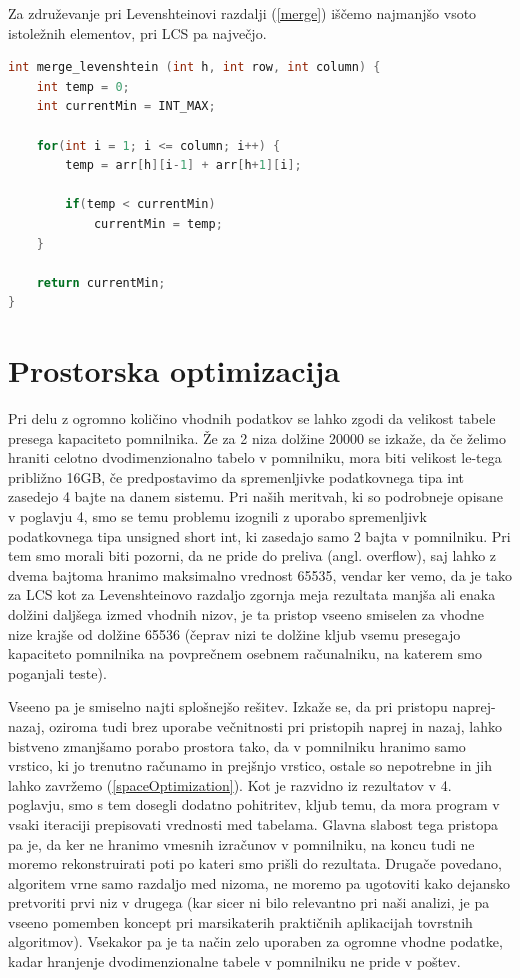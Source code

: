 \documentclass[a4paper,12pt,openright]{book}
\begin{document}
Za združevanje pri Levenshteinovi razdalji (\ref{merge}) iščemo najmanjšo vsoto istoležnih elementov, pri LCS pa največjo. 


\bigskip
\begin{lstlisting}[language=C++, caption={Združevalna funkcija za Levenshteinovo razdaljo}, captionpos=b, label=merge]
int merge_levenshtein (int h, int row, int column) {
    int temp = 0;
    int currentMin = INT_MAX;

    for(int i = 1; i <= column; i++) {
        temp = arr[h][i-1] + arr[h+1][i];

        if(temp < currentMin)
            currentMin = temp;
    }

    return currentMin;
}
\end{lstlisting}




\section{Prostorska optimizacija}

Pri delu z ogromno količino vhodnih podatkov se lahko zgodi da velikost tabele presega kapaciteto pomnilnika. Že za 2 niza dolžine 20000 se izkaže, da če želimo hraniti celotno dvodimenzionalno tabelo v pomnilniku, mora biti velikost le-tega približno 16GB, če predpostavimo da spremenljivke podatkovnega tipa int zasedejo 4 bajte na danem sistemu. Pri naših meritvah, ki so podrobneje opisane v poglavju 4, smo se temu problemu izognili z uporabo spremenljivk podatkovnega tipa unsigned short int, ki zasedajo samo 2 bajta v pomnilniku. Pri tem smo morali biti pozorni, da ne pride do preliva (angl. overflow), saj lahko z dvema bajtoma hranimo maksimalno vrednost 65535, vendar ker vemo, da je tako za LCS kot za Levenshteinovo razdaljo zgornja meja rezultata manjša ali enaka dolžini daljšega izmed vhodnih nizov, je ta pristop vseeno smiselen za vhodne nize krajše od dolžine 65536 (čeprav nizi te dolžine kljub vsemu presegajo kapaciteto pomnilnika na povprečnem osebnem računalniku, na katerem smo poganjali teste). 

Vseeno pa je smiselno najti splošnejšo rešitev. Izkaže se, da pri pristopu naprej-nazaj, oziroma tudi brez uporabe večnitnosti pri pristopih naprej in nazaj, lahko bistveno zmanjšamo porabo prostora tako, da v pomnilniku hranimo samo vrstico, ki jo trenutno računamo in prejšnjo vrstico, ostale so nepotrebne in jih lahko zavržemo (\ref{spaceOptimization}). Kot je razvidno iz rezultatov v 4. poglavju, smo s tem dosegli dodatno pohitritev, kljub temu, da mora program v vsaki iteraciji prepisovati vrednosti med tabelama. Glavna slabost tega pristopa pa je, da ker ne hranimo vmesnih izračunov v pomnilniku, na koncu tudi ne moremo rekonstruirati poti po kateri smo prišli do rezultata. Drugače povedano, algoritem vrne samo razdaljo med nizoma, ne moremo pa ugotoviti kako dejansko pretvoriti prvi niz v drugega (kar sicer ni bilo relevantno pri naši analizi, je pa vseeno pomemben koncept pri marsikaterih praktičnih aplikacijah tovrstnih algoritmov). Vsekakor pa je ta način zelo uporaben za ogromne vhodne podatke, kadar hranjenje dvodimenzionalne tabele v pomnilniku ne pride v poštev. 
\end{document}
